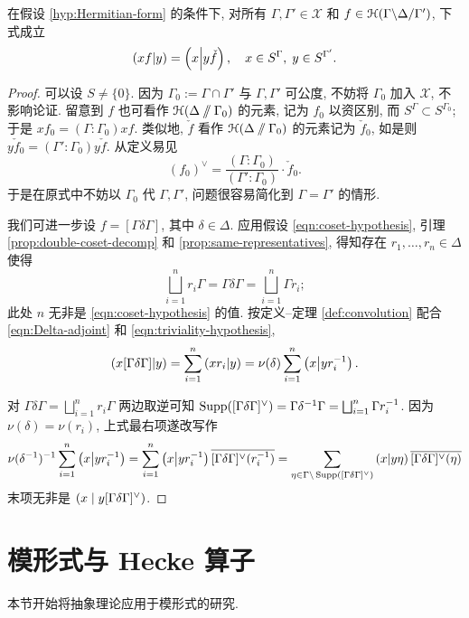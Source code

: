 \begin{proposition}\label{prop:Hermitian-adjoint}
	在假设 \ref{hyp:Hermitian-form} 的条件下, 对所有 $\Gamma, \Gamma' \in \mathcal{X}$ 和 $f \in \EuScript{H}(\Gamma \backslash \Delta /\Gamma')$, 下式成立
	\[ \left( xf \middle| y \right) = \left( x \middle| y\check{f} \right), \quad x \in S^\Gamma, \; y \in S^{\Gamma'}. \]
\end{proposition}
\begin{proof}
	可以设 $S \neq \{0\}$. 因为 $\Gamma_0 := \Gamma \cap \Gamma'$ 与 $\Gamma, \Gamma'$ 可公度, 不妨将 $\Gamma_0$ 加入 $\mathcal{X}$, 不影响论证. 留意到 $f$ 也可看作 $\EuScript{H}(\Delta \sslash \Gamma_0)$ 的元素, 记为 $f_0$ 以资区别, 而 $S^\Gamma \subset S^{\Gamma_0}$; 于是 $xf_0 = (\Gamma:\Gamma_0) xf$. 类似地, $\check{f}$ 看作 $\EuScript{H}(\Delta \sslash \Gamma_0)$ 的元素记为 $\check{f}_0$, 如是则 $y\check{f}_0 = (\Gamma':\Gamma_0) y\check{f}$. 从定义易见
	\[ (f_0)^\vee = \dfrac{(\Gamma:\Gamma_0)}{(\Gamma':\Gamma_0)} \cdot \check{f}_0. \]
	于是在原式中不妨以 $\Gamma_0$ 代 $\Gamma, \Gamma'$, 问题很容易简化到 $\Gamma=\Gamma'$ 的情形.

	我们可进一步设 $f = [\Gamma\delta\Gamma]$, 其中 $\delta \in \Delta$. 应用假设 \eqref{eqn:coset-hypothesis}, 引理 \ref{prop:double-coset-decomp} 和 \ref{prop:same-representatives}, 得知存在 $r_1, \ldots, r_n \in \Delta$ 使得
	\[ \bigsqcup_{i=1}^n r_i \Gamma = \Gamma\delta\Gamma = \bigsqcup_{i=1}^n \Gamma r_i; \]
	此处 $n$ 无非是 \eqref{eqn:coset-hypothesis} 的值. 按定义--定理 \ref{def:convolution} 配合 \eqref{eqn:Delta-adjoint} 和 \eqref{eqn:triviality-hypothesis},
	\[ \left( x[\Gamma\delta\Gamma] \middle| y \right) = \sum_{i=1}^n \left( x r_i \middle| y \right) = \nu(\delta)\sum_{i=1}^n \left( x \middle| y r_i^{-1} \right). \]
	
	对 $\Gamma\delta\Gamma = \bigsqcup_{i=1}^n r_i \Gamma$ 两边取逆可知 $\operatorname{Supp}([\Gamma\delta\Gamma]^\vee) = \Gamma\delta^{-1}\Gamma = \bigsqcup_{i=1}^n \Gamma r_i^{-1}$. 因为 $\nu(\delta) = \nu(r_i)$, 上式最右项遂改写作
	\[ \nu(\delta^{-1})^{-1} \sum_{i=1}^n \left( x \middle| y r_i^{-1} \right) = \sum_{i=1}^n \left( x \middle| y r_i^{-1} \right) \overline{[\Gamma\delta\Gamma]^\vee(r_i^{-1})} = \sum_{\eta \in \Gamma \backslash \operatorname{Supp}([\Gamma\delta\Gamma]^\vee)} \left( x \middle| y\eta \right) \overline{[\Gamma\delta\Gamma]^\vee(\eta)} \]
	末项无非是 $\left( x\;  \middle| \; y[\Gamma\delta\Gamma]^\vee \right)$.
\end{proof}


\section{模形式与 Hecke 算子}\label{sec:modular-form-vs-Hecke-algebra}
本节开始将抽象理论应用于模形式的研究.


